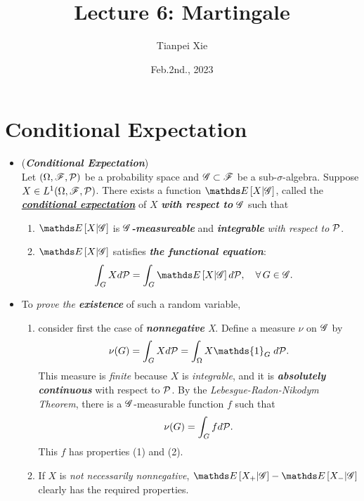 \documentclass[11pt]{article}
\begin{document}
\title{Lecture 6: Martingale}
\author{ Tianpei Xie}
\date{ Feb.2nd., 2023 }
\maketitle
\tableofcontents
\newpage
\section{Conditional Expectation}
\begin{itemize}
\item \begin{definition} (\emph{\textbf{Conditional Expectation}}) \citep{resnick2013probability}\\
Let $(\Omega, {\mathscr F}, {\mathcal P})$ be a probability space and ${\mathscr G} \subset {\mathscr F}$ be a sub-$\sigma$-algebra. Suppose $X\in  L^{1}(\Omega, {\mathscr F}, {\mathcal P})$. There exists a function $\E{}{X| \srG}$, called the \underline{\emph{\textbf{conditional expectation}}} of $X$ \emph{\textbf{with respect to}} ${\mathscr G}$ such that
\begin{enumerate}
\item $\E{}{X| \srG}$ is \emph{\textbf{${\mathscr G}$-measureable}} and \emph{\textbf{integrable}} \emph{with respect to} ${\mathcal P}$. 

\item $\E{}{X| \srG}$ satisfies \emph{\textbf{the functional equation}}: 
\begin{align*}
\int_{G} X d\cP &= \int_{G} \E{}{X| \srG} d\cP, \quad \forall\, G \in \srG.
\end{align*}
\end{enumerate}
\end{definition}

\item \begin{remark}
To \emph{prove the \textbf{existence}} of such a random variable, 
\begin{enumerate}
\item consider first the case of
\emph{\textbf{nonnegative} X}. Define a measure $\nu$ on ${\mathscr G}$ by 
\begin{align*}
\nu(G) = \int_{G} X d\cP = \int_{\Omega} X \mathds{1}_{G}\; d\cP.
\end{align*}
This measure is \emph{finite} because $X$ is \emph{integrable}, and it is \emph{\textbf{absolutely continuous}} with respect to ${\mathcal P}$. By the \emph{Lebesgue-Radon-Nikodym Theorem},  there is a ${\mathscr G}$-measurable function $f$
such that 
\begin{align*}
\nu(G) = \int_{G} f d{\mathcal P}.
\end{align*}
This $f$ has properties (1) and (2). 
\item If $X$ is \emph{not necessarily nonnegative}, $\E{}{X_{+}| \srG} - \E{}{X_{-}| \srG}$ clearly has the required properties.
\end{enumerate}
\end{remark}


\end{itemize}
\end{document}
